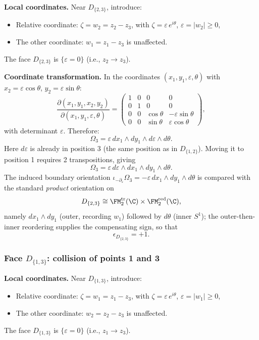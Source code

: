 \textbf{Local coordinates.} Near $D_{\{2,3\}}$, introduce:
\begin{itemize}
\item Relative coordinate: $\zeta = w_2 = z_2 - z_3$, with $\zeta = \varepsilon\,e^{i\theta}$, $\varepsilon = |w_2| \ge 0$,
\item The other coordinate: $w_1 = z_1 - z_3$ is unaffected.
\end{itemize}
The face $D_{\{2,3\}}$ is $\{\varepsilon = 0\}$ (i.e., $z_2 \to z_3$).

\textbf{Coordinate transformation.} In the coordinates $(x_1,y_1,\varepsilon,\theta)$ with $x_2 = \varepsilon\cos\theta$, $y_2 = \varepsilon\sin\theta$:
\[
\frac{\partial(x_1,y_1,x_2,y_2)}{\partial(x_1,y_1,\varepsilon,\theta)} = \begin{pmatrix} 1&0&0&0\\ 0&1&0&0\\ 0&0&\cos\theta&-\varepsilon\sin\theta\\ 0&0&\sin\theta&\varepsilon\cos\theta\end{pmatrix},
\]
with determinant $\varepsilon$. Therefore:
\[
\Omega_3 = \varepsilon\,dx_1\wedge dy_1\wedge d\varepsilon\wedge d\theta.
\]
Here $d\varepsilon$ is already in position 3 (the same position as in $D_{\{1,2\}}$). Moving it to position 1 requires 2 transpositions, giving
\[
\Omega_3 = \varepsilon\,d\varepsilon\wedge dx_1\wedge dy_1\wedge d\theta.
\]
The induced boundary orientation $\iota_{-\partial_\varepsilon}\Omega_3 = -\varepsilon\,dx_1\wedge dy_1\wedge d\theta$ is compared with the standard \emph{product} orientation on
\[
D_{\{2,3\}}\cong
\FM_2^{\mathrm{tr}}(\C)\times\FM_2^{\mathrm{red}}(\C),
\]
namely $dx_1\wedge dy_1$ (outer, recording $w_1$) followed by $d\theta$ (inner $S^1$); the outer-then-inner reordering supplies the compensating sign, so that
\begin{equation}
\label{eq:eps-D23}
\boxed{\epsilon_{D_{\{2,3\}}} = +1.}
\end{equation}

\subsubsection{\texorpdfstring{Face $D_{\{1,3\}}$: collision of points 1 and 3}{Face D13: collision of points 1 and 3}}

\textbf{Local coordinates.} Near $D_{\{1,3\}}$, introduce:
\begin{itemize}
\item Relative coordinate: $\zeta = w_1 = z_1 - z_3$, with $\zeta = \varepsilon\,e^{i\theta}$, $\varepsilon = |w_1| \ge 0$,
\item The other coordinate: $w_2 = z_2 - z_3$ is unaffected.
\end{itemize}
The face $D_{\{1,3\}}$ is $\{\varepsilon = 0\}$ (i.e., $z_1 \to z_3$).


